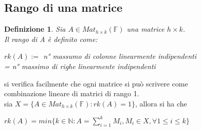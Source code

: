 \documentclass[a4paper,12pt]{article}
\theoremstyle{def}
\newtheorem*{definition}{Definizione}
\theoremstyle{prop}
\theoremstyle{esempio}
\theoremstyle{dimostrazione}
\theoremstyle{teo}
\theoremstyle{osservazione}
\begin{document}
\subsection{Rango di una matrice}
\begin{definition}
	Sia \(A \in Mat_{h \times k}(\mathbb{F})\) una matrice \(h \times k\).\\
	Il rango di A è definito come:
	\begin{center}
		\(rk(A):=\) n° massumo di colonne linearmente indipendenti\\
		= n° massimo di righe linearmente indipendenti
	\end{center}
\end{definition}
si verifica facilmente che ogni matrice si può scrivere come\\
combinazione lineare di matrici di rango 1.\\
sia \(X = \{A \in Mat_{h \times k}(\mathbb{F}) : rk(A) = 1\}\), allora si ha che 
\begin{center}
	\(rk(A) = min\{k \in \mathbb{N} : A = \sum_{i = 1}^{k} M_i , M_i \in X, \forall 1 \leq i \leq k\}\)
\end{center}
\end{document}
